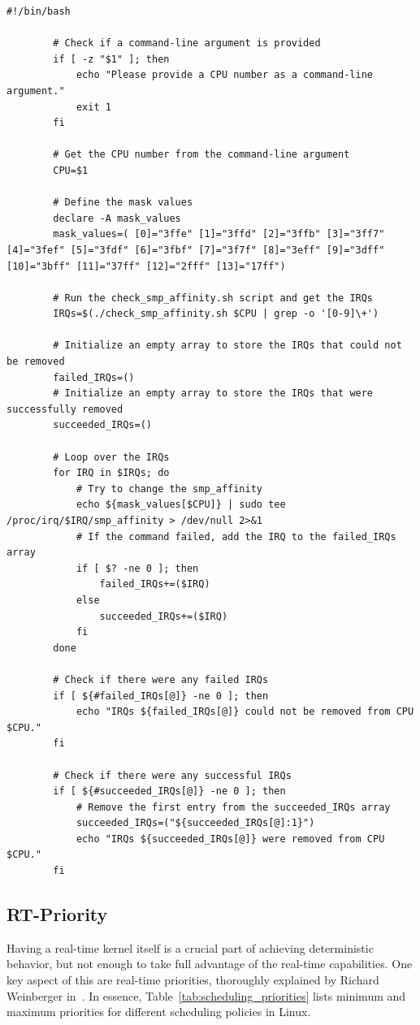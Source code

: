 \documentclass[MMR,Master,english]{twbook}
\begin{document}
\vspace{1em}
\begin{minipage}{0.95\columnwidth}
	\begin{lstlisting}[name={Change IRQ assignment of a CPU},label={script:change_smp_affinity}]
		#!/bin/bash

		# Check if a command-line argument is provided
		if [ -z "$1" ]; then
			echo "Please provide a CPU number as a command-line argument."
			exit 1
		fi
		
		# Get the CPU number from the command-line argument
		CPU=$1
		
		# Define the mask values
		declare -A mask_values
		mask_values=( [0]="3ffe" [1]="3ffd" [2]="3ffb" [3]="3ff7" [4]="3fef" [5]="3fdf" [6]="3fbf" [7]="3f7f" [8]="3eff" [9]="3dff" [10]="3bff" [11]="37ff" [12]="2fff" [13]="17ff")
		
		# Run the check_smp_affinity.sh script and get the IRQs
		IRQs=$(./check_smp_affinity.sh $CPU | grep -o '[0-9]\+')
		
		# Initialize an empty array to store the IRQs that could not be removed
		failed_IRQs=()
		# Initialize an empty array to store the IRQs that were successfully removed
		succeeded_IRQs=()
		
		# Loop over the IRQs
		for IRQ in $IRQs; do
			# Try to change the smp_affinity
			echo ${mask_values[$CPU]} | sudo tee /proc/irq/$IRQ/smp_affinity > /dev/null 2>&1
			# If the command failed, add the IRQ to the failed_IRQs array
			if [ $? -ne 0 ]; then
				failed_IRQs+=($IRQ)
			else
				succeeded_IRQs+=($IRQ)
			fi
		done
		
		# Check if there were any failed IRQs
		if [ ${#failed_IRQs[@]} -ne 0 ]; then
			echo "IRQs ${failed_IRQs[@]} could not be removed from CPU $CPU."
		fi
		
		# Check if there were any successful IRQs
		if [ ${#succeeded_IRQs[@]} -ne 0 ]; then
			# Remove the first entry from the succeeded_IRQs array
			succeeded_IRQs=("${succeeded_IRQs[@]:1}")
			echo "IRQs ${succeeded_IRQs[@]} were removed from CPU $CPU."
		fi		
\end{lstlisting}
\end{minipage}
\subsection{RT-Priority}
Having a real-time kernel itself is a crucial part of achieving deterministic behavior, but not enough to take full advantage of the real-time capabilities. One key aspect of this are real-time priorities, thoroughly explained by Richard Weinberger in~\cite{LinuxProcessPriorities}. In essence, Table~\ref{tab:scheduling_priorities} lists minimum and maximum priorities for different scheduling policies in Linux.
\end{document}

